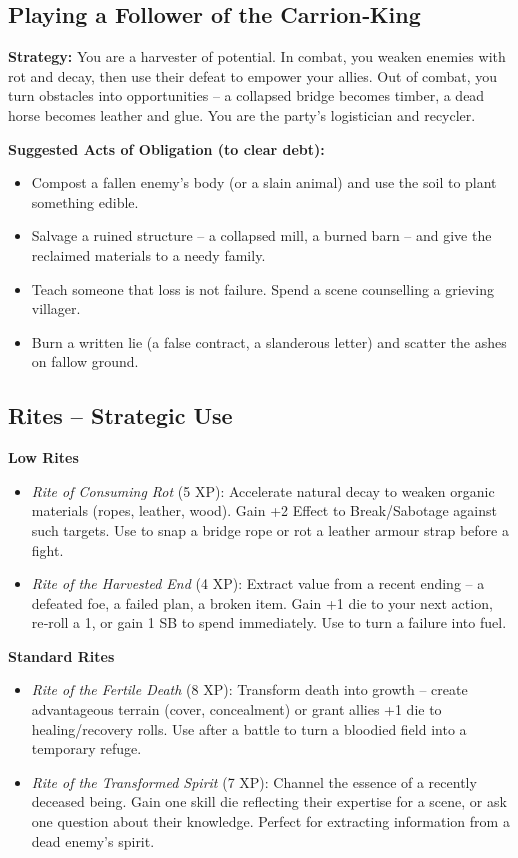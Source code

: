 \documentclass[10pt,a5paper]{book}
\begin{document}
\subsection*{Playing a Follower of the Carrion‑King}

\textbf{Strategy:} You are a harvester of potential. In combat, you weaken enemies with rot and decay, then use their defeat to empower your allies. Out of combat, you turn obstacles into opportunities – a collapsed bridge becomes timber, a dead horse becomes leather and glue. You are the party’s logistician and recycler.

\textbf{Suggested Acts of Obligation (to clear debt):}
\begin{itemize}
    \item Compost a fallen enemy’s body (or a slain animal) and use the soil to plant something edible.
    \item Salvage a ruined structure – a collapsed mill, a burned barn – and give the reclaimed materials to a needy family.
    \item Teach someone that loss is not failure. Spend a scene counselling a grieving villager.
    \item Burn a written lie (a false contract, a slanderous letter) and scatter the ashes on fallow ground.
\end{itemize}

\subsection*{Rites – Strategic Use}

\textbf{Low Rites}
\begin{itemize}
    \item \textit{Rite of Consuming Rot} (5 XP): Accelerate natural decay to weaken organic materials (ropes, leather, wood). Gain +2 Effect to Break/Sabotage against such targets. Use to snap a bridge rope or rot a leather armour strap before a fight.
    \item \textit{Rite of the Harvested End} (4 XP): Extract value from a recent ending – a defeated foe, a failed plan, a broken item. Gain +1 die to your next action, re‑roll a 1, or gain 1 SB to spend immediately. Use to turn a failure into fuel.
\end{itemize}

\textbf{Standard Rites}
\begin{itemize}
    \item \textit{Rite of the Fertile Death} (8 XP): Transform death into growth – create advantageous terrain (cover, concealment) or grant allies +1 die to healing/recovery rolls. Use after a battle to turn a bloodied field into a temporary refuge.
    \item \textit{Rite of the Transformed Spirit} (7 XP): Channel the essence of a recently deceased being. Gain one skill die reflecting their expertise for a scene, or ask one question about their knowledge. Perfect for extracting information from a dead enemy’s spirit.
\end{itemize}
\end{document}
